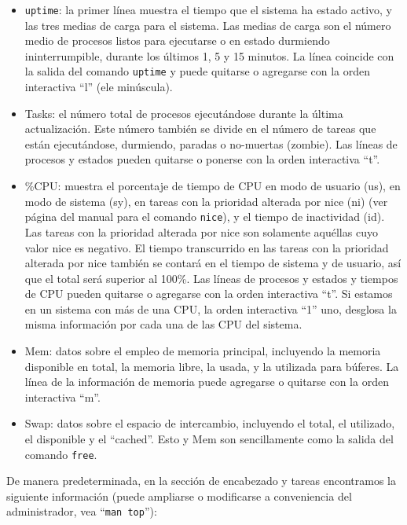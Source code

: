 \documentclass[12pt]{article}
\begin{document}
\begin{itemize}
\item \texttt{uptime}: la primer línea muestra el tiempo
 que el sistema ha  estado  activo,  y  las  tres medias de carga para el 
sistema. Las medias de carga son  el número medio de procesos listos  para
ejecutarse  o en estado durmiendo ininterrumpible, durante  los  últimos
1,  5  y  15  minutos.  La línea coincide con la salida del comando 
\texttt{uptime} y puede quitarse o agregarse con la orden interactiva 
``l'' (ele minúscula).
\item  Tasks: el  número  total  de  procesos ejecutándose durante  la  
última actualización. Este número también  se  divide  en  el  número 
de  tareas  que  están  ejecutándose, durmiendo, paradas o no-muertas 
(zombie).  Las líneas de procesos y estados pueden quitarse o ponerse con 
la orden interactiva ``t''.
\item  \%CPU: muestra el porcentaje de tiempo de CPU en modo de usuario 
(us), en modo  de sistema (sy), en tareas con la prioridad alterada por
 nice (ni) (ver página del manual para el comando \texttt{nice}), y el 
 tiempo  de  inactividad (id).  Las tareas con la prioridad alterada por 
nice son solamente aquéllas cuyo  valor  nice  es  negativo. El tiempo  
transcurrido  en  las tareas con la prioridad alterada por nice también 
se contará en el tiempo de sistema y de usuario,  así que  el  total  
será  superior  al  100\%. Las líneas de procesos y estados y tiempos
 de CPU pueden quitarse o agregarse  con  la  orden interactiva ``t''.
Si estamos en un sistema con más de una CPU, la orden interactiva ``1'' 
uno, desglosa la misma información por cada una de las CPU del sistema.
\item Mem: datos sobre el empleo de memoria principal, incluyendo la 
memoria disponible en total,  la  memoria  libre,  la  usada, y  la
utilizada  para  búferes.  La  línea  de la información de memoria puede 
agregarse o quitarse con la orden interactiva ``m''.
\item Swap: datos sobre el  espacio  de  intercambio,  incluyendo  el  
total,  el utilizado, el disponible  y  el ``cached''. Esto y Mem son 
sencillamente como la salida del comando \texttt{free}.
\end{itemize}

De manera predeterminada, en la sección de encabezado y tareas encontramos
la siguiente información (puede ampliarse o modificarse a conveniencia del
administrador, vea ``\texttt{man top}''):
\end{document}
